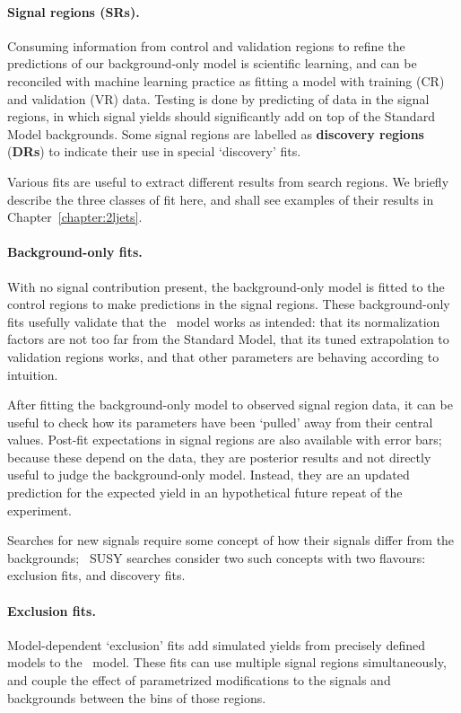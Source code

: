 \paragraph{Signal regions (SRs).}
Consuming information from control and validation regions to refine the
predictions of our background-only model is scientific learning, and can be
reconciled with machine learning practice as fitting a model with training
(CR) and validation (VR) data.
Testing is done by predicting of data in the signal regions,
in which signal yields should significantly add on top of the Standard Model
backgrounds.
Some signal regions are labelled as \textbf{discovery regions} (\textbf{DRs})
to indicate their use in special `discovery' fits.

Various fits are useful to extract different results from search regions.
We briefly describe the three classes of fit here, and shall see examples
of their results in Chapter~\ref{chapter:2ljets}.

\paragraph{Background-only fits.}
With no signal contribution present, the background-only model is fitted
to the control regions to make predictions in the signal regions.
These background-only fits usefully validate that the \heplikelihood\ model
works as intended: that its normalization factors are not too far from the
Standard Model, that its tuned extrapolation to validation regions works,
and that other parameters are behaving according to intuition.

After fitting the background-only model to observed signal region data,
it can be useful to check how its parameters have been `pulled' away from their
central values.
Post-fit expectations in signal regions are also available with error bars;
because these depend on the data, they are posterior results and not directly
useful to judge the background-only model.
Instead, they are an updated prediction for the expected yield in an
hypothetical future repeat of the experiment.

Searches for new signals require some concept of how their signals differ
from the backgrounds;
\atlas\ SUSY searches consider two such concepts with two flavours:
exclusion fits, and discovery fits.

\paragraph{Exclusion fits.}
Model-dependent `exclusion' fits add simulated yields from precisely
defined models to the \heplikelihood\ model.
These fits can use multiple signal regions simultaneously, and couple the
effect of parametrized modifications to the signals and backgrounds between
the bins of those regions.

